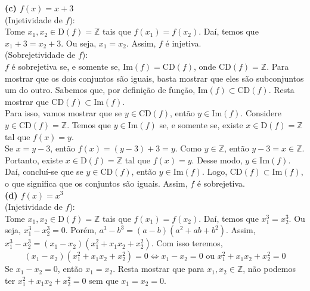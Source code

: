\documentclass[12pt, a4paper]{article}
\begin{document}
\textbf{(c) \(f(x) = x+3\)} \\

(Injetividade de \(f\)): \\
Tome \(x_1, x_2 \in \mathrm{D}(f)=\mathbb{Z}\) tais que \(f(x_1) = f(x_2)\). Daí, temos que \(x_1 + 3 = x_2 + 3\). Ou seja, \(x_1 = x_2\). Assim, \(f\) é injetiva. \\

(Sobrejetividade de \(f\)): \\
\(f\) é sobrejetiva se, e somente se, \(\mathrm{Im}(f) = \mathrm{CD}(f)\), onde \(\mathrm{CD}(f) = \mathbb{Z}\). Para mostrar que os dois conjuntos são iguais, basta mostrar que eles são subconjuntos um do outro. Sabemos que, por definição de função, \(\mathrm{Im}(f) \subset \mathrm{CD}(f)\). Resta mostrar que \( \mathrm{CD}(f) \subset \mathrm{Im}(f)\). \\

Para isso, vamos mostrar que se \(y \in \mathrm{CD}(f)\), então \(y \in \mathrm{Im}(f)\). Considere \(y \in \mathrm{CD}(f) = \mathbb{Z}\). Temos que \(y \in \mathrm{Im}(f)\) se, e somente se, existe \(x \in \mathrm{D}(f) = \mathbb{Z}\) tal que \(f(x) = y\).  \\

Se \(x = y -3\), então \(f(x) = (y-3)+3 = y\). Como \(y \in \mathbb{Z}\), então \(y-3 = x \in \mathbb{Z}\). Portanto, existe \(x \in \mathrm{D}(f) = \mathbb{Z}\) tal que \(f(x) = y\). Desse modo, \(y \in \mathrm{Im}(f)\). \\

Daí, concluí-se que se \(y \in \mathrm{CD}(f)\), então \(y \in \mathrm{Im}(f)\). Logo, \( \mathrm{CD}(f) \subset \mathrm{Im}(f)\), o que significa que os conjuntos são iguais. Assim, \(f\) é sobrejetiva. \\


\textbf{(d) \(f(x) = x^3\)} \\

(Injetividade de \(f\)): \\
Tome \(x_1, x_2 \in \mathrm{D}(f)=\mathbb{Z}\) tais que \(f(x_1) = f(x_2)\). Daí, temos que \(x_1 ^3 = x_2^ 3\). Ou seja, \(x_1^3 - x_2^3 = 0\). Porém, \(a^3 - b^3 = (a-b)(a^2 + ab + b^2)\). Assim, \(x_1^3 - x_2^3 = (x_1 - x_2)(x_1^2 + x_1x_2 + x_2^2)\). Com isso teremos, \[(x_1 - x_2)(x_1^2 + x_1x_2 + x_2^2) = 0 \Longleftrightarrow x_1 - x_2 = 0 \text{ ou } x_1^2 + x_1x_2 + x_2^2 = 0\]
Se \(x_1 - x_2 = 0\), então \(x_1 = x_2\). Resta mostrar que para \(x_1, x_2 \in \mathbb{Z}\), não podemos ter \(x_1^2 + x_1x_2 +x_2^2 = 0\) sem que \(x_1 = x_2 = 0\). \\
\end{document}
